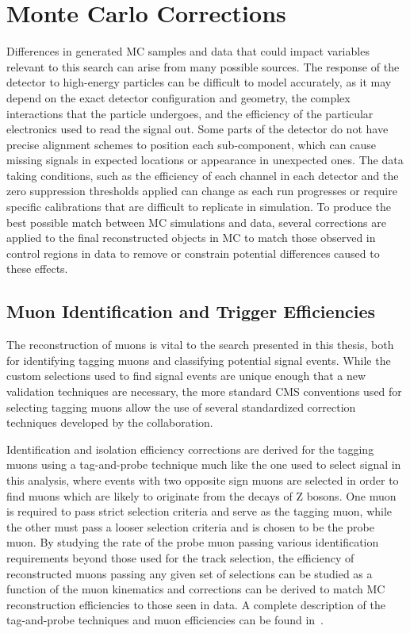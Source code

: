 \section{Monte Carlo Corrections}
Differences in generated MC samples and data that could impact variables relevant to this search can arise from many possible sources.
The response of the detector to high-energy particles can be difficult to model accurately, as it may depend on the exact detector configuration and geometry, the complex interactions that the particle undergoes, and the efficiency of the particular electronics used to read the signal out.
Some parts of the detector do not have precise alignment schemes to position each sub-component, which can cause missing signals in expected locations or appearance in unexpected ones. 
The data taking conditions, such as the efficiency of each channel in each detector and the zero suppression thresholds applied can change as each run progresses or require specific calibrations that are difficult to replicate in simulation.
To produce the best possible match between MC simulations and data, several corrections are applied to the final reconstructed objects in MC to match those observed in control regions in data to remove or constrain potential differences caused to these effects.

\subsection{Muon Identification and Trigger Efficiencies}
The reconstruction of muons is vital to the search presented in this thesis, both for identifying tagging muons and classifying potential signal events.
While the custom selections used to find signal events are unique enough that a new validation techniques are necessary, the more standard CMS conventions used for selecting tagging muons allow the use of several standardized correction techniques developed by the collaboration.

Identification and isolation efficiency corrections are derived for the tagging muons using a tag-and-probe technique much like the one used to select signal in this analysis, where events with two opposite sign muons are selected in order to find muons which are likely to originate from the decays of Z bosons.
One muon is required to pass strict selection criteria and serve as the tagging muon, while the other must pass a looser selection criteria and is chosen to be the probe muon.
By studying the rate of the probe muon passing various identification requirements beyond those used for the track selection, the efficiency of reconstructed muons passing any given set of selections can be studied as a function of the muon kinematics and corrections can be derived to match MC reconstruction efficiencies to those seen in data. 
A complete description of the tag-and-probe techniques and muon efficiencies can be found in~\cite{cmsMuonPerformance}.

